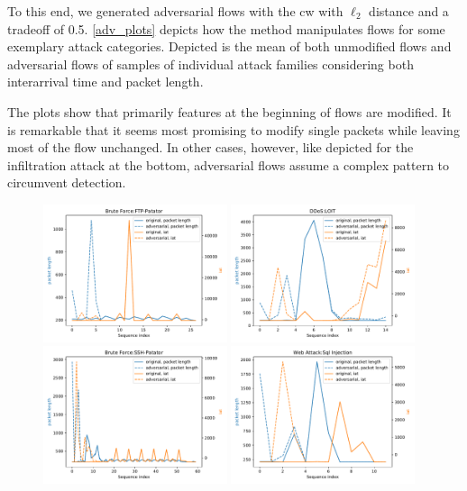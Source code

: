 \documentclass[conference]{IEEEtran}
\begin{document}
To this end, we generated adversarial flows with the \gls{cw} with $\ell_2$ distance and a tradeoff of 0.5. \autoref{adv_plots} depicts how the method manipulates flows for some exemplary attack categories. Depicted is the mean of both unmodified flows and adversarial flows  of samples of individual attack families considering both interarrival time and packet length.

The plots show that primarily features at the beginning of flows are modified. It is remarkable that it seems most promising to modify single packets while leaving most of the flow unchanged. In other cases, however, like depicted for the infiltration attack at the bottom, adversarial flows assume a complex pattern to circumvent detection.

\begin{figure}[p]
\includegraphics[width=0.48\textwidth]{../plots/plot_adv/1.pdf}
\includegraphics[width=0.48\textwidth]{../plots/plot_adv/2.pdf}
\includegraphics[width=0.48\textwidth]{../plots/plot_adv/3.pdf}
\includegraphics[width=0.48\textwidth]{../plots/plot_adv/4.pdf}

\end{figure}
\end{document}
